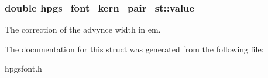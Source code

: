 \subsubsection[{value}]{\setlength{\rightskip}{0pt plus 5cm}double {\bf hpgs\_\-font\_\-kern\_\-pair\_\-st::value}}\label{structhpgs__font__kern__pair__st_a29b9815a791a3ee31a208cd4c84810ac}
The correction of the advynce width in em. 

The documentation for this struct was generated from the following file:\begin{DoxyCompactItemize}
\item 
hpgsfont.h\end{DoxyCompactItemize}
